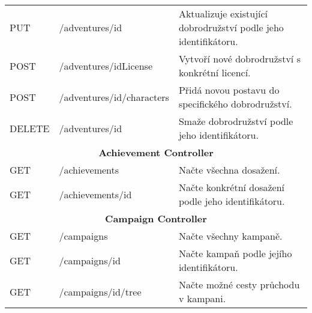 \begin{longtable}{|l|l|p{}|}
    PUT             & /adventures/{id}                       & Aktualizuje existující dobrodružství podle jeho identifikátoru.                                                                            \\
    POST            & /adventures/{idLicense}                & Vytvoří nové dobrodružství s konkrétní licencí.                                                                                            \\
    POST            & /adventures/{id}/characters            & Přidá novou postavu do specifického dobrodružství.                                                                                         \\
    DELETE          & /adventures/{id}                       & Smaže dobrodružství podle jeho identifikátoru.                                                                                             \\
    \hline
    \multicolumn{3}{|c|}{\textbf{Achievement Controller}}                                                                                                                                                 \\
    \hline
    GET             & /achievements                          & Načte všechna dosažení.                                                                                                                    \\
    GET             & /achievements/{id}                     & Načte konkrétní dosažení podle jeho identifikátoru.                                                                                        \\
    \hline
    \multicolumn{3}{|c|}{\textbf{Campaign Controller}}                                                                                                                                                    \\
    \hline
    GET             & /campaigns                             & Načte všechny kampaně.                                                                                                                     \\
    GET             & /campaigns/{id}                        & Načte kampaň podle jejího identifikátoru.                                                                                                  \\
    GET             & /campaigns/{id}/tree                   & Načte možné cesty průchodu v kampani.                                                                                                      \\

\end{longtable}
